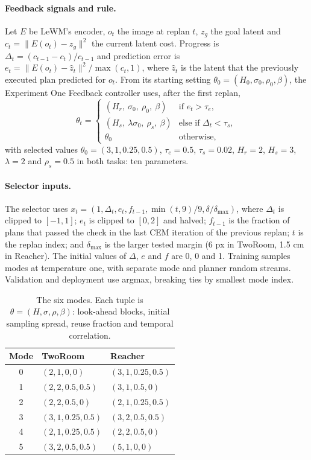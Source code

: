 \documentclass[sigconf,nonacm]{acmart}
\begin{document}
\paragraph{Feedback signals and rule.} Let $E$ be LeWM's encoder, $o_t$
the image at replan $t$, $z_g$ the goal latent and $c_t=\lVert
E(o_t)-z_g\rVert^2$ the current latent cost. Progress is
$\Delta_t=(c_{t-1}-c_t)/c_{t-1}$ and prediction error is
$e_t=\lVert E(o_t)-\hat z_t\rVert^2/\max(c_t,1)$, where $\hat z_t$ is the
latent that the previously executed plan predicted for $o_t$. From its
starting setting $\theta_0=(H_0,\sigma_0,\rho_0,\beta)$, the Experiment One
Feedback controller uses, after the first replan,
\begin{equation*}
\theta_t=\begin{cases}
(H_r,\ \sigma_0,\ \rho_0,\ \beta) & \text{if } e_t>\tau_e,\\
(H_s,\ \lambda\sigma_0,\ \rho_s,\ \beta) & \text{else if } \Delta_t<\tau_s,\\
\theta_0 & \text{otherwise},
\end{cases}
\end{equation*}
with selected values $\theta_0=(3,1,0.25,0.5)$, $\tau_e=0.5$, $\tau_s=0.02$,
$H_r=2$, $H_s=3$, $\lambda=2$ and $\rho_s=0.5$ in both tasks: ten
parameters.

\paragraph{Selector inputs.} The selector uses
$x_t=(1,\Delta_t,e_t,f_{t-1},\min(t,9)/9,\delta/\delta_{\max})$, where
$\Delta_t$ is clipped to $[-1,1]$; $e_t$ is clipped to $[0,2]$ and halved; $f_{t-1}$ is
the fraction of plans that passed the check in the last CEM iteration of
the previous replan; $t$ is the replan index; and $\delta_{\max}$ is the
larger tested margin (6 px in TwoRoom, 1.5 cm in Reacher). The initial
values of $\Delta$, $e$ and $f$ are 0, 0 and 1. Training samples modes at
temperature one, with separate mode and planner random streams. Validation
and deployment use argmax, breaking ties by smallest mode index.

\begin{table}[htbp]
\caption{The six modes. Each tuple is $\theta=(H,\sigma,\rho,\beta)$:
look-ahead blocks, initial sampling spread, reuse fraction and temporal
correlation.}
\label{tab:modes}\centering\small
\begin{tabular}{cll}
\toprule
Mode & TwoRoom & Reacher \\
\midrule
0 & $(2,1,0,0)$ & $(3,1,0.25,0.5)$ \\
1 & $(2,2,0.5,0.5)$ & $(3,1,0.5,0)$ \\
2 & $(2,2,0.5,0)$ & $(2,1,0.25,0.5)$ \\
3 & $(3,1,0.25,0.5)$ & $(3,2,0.5,0.5)$ \\
4 & $(2,1,0.25,0.5)$ & $(2,2,0.5,0)$ \\
5 & $(3,2,0.5,0.5)$ & $(5,1,0,0)$ \\
\bottomrule
\end{tabular}
\end{table}
\end{document}
